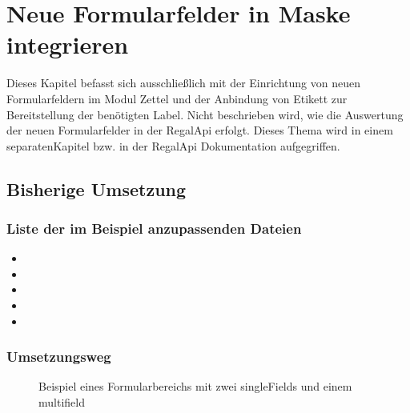 \documentclass[letterpaper,10pt,ngerman]{sphinxmanual}
\begin{document}
\chapter{Neue Formularfelder in Maske integrieren}
\label{\detokenize{developer-docs/addForm:neue-formularfelder-in-maske-integrieren}}\label{\detokenize{developer-docs/addForm::doc}}
Dieses Kapitel befasst sich ausschließlich mit der Einrichtung von neuen Formularfeldern im Modul Zettel und der Anbindung von Etikett zur Bereitstellung der benötigten Label.
Nicht beschrieben wird, wie die Auswertung der neuen Formularfelder in der Regal\sphinxhyphen{}Api erfolgt. Dieses Thema wird in einem separatenKapitel bzw. in der Regal\sphinxhyphen{}Api Dokumentation aufgegriffen.


\section{Bisherige Umsetzung}
\label{\detokenize{developer-docs/addForm:bisherige-umsetzung}}

\subsection{Liste der im Beispiel anzupassenden Dateien}
\label{\detokenize{developer-docs/addForm:liste-der-im-beispiel-anzupassenden-dateien}}\begin{itemize}
\item {} 

\item {} 

\item {} 

\item {} 

\item {} 

\end{itemize}


\subsection{Umsetzungsweg}
\label{\detokenize{developer-docs/addForm:umsetzungsweg}}
\begin{figure}[htbp]
\centering
\capstart

\noindent{}
\caption{Beispiel eines Formularbereichs mit zwei singleFields und einem multifield}\label{\detokenize{developer-docs/addForm:id9}}\end{figure}
\end{document}
